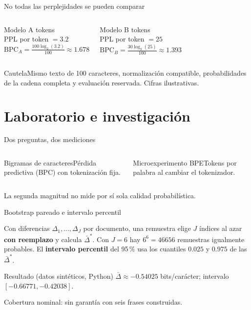 \documentclass[aspectratio=169,10pt]{beamer}
\begin{document}
\begin{frame}{No todas las perplejidades se pueden comparar}
\begin{columns}\begin{block}{Modelo A} tokens\\PPL por token $=3.2$\\$\mathrm{BPC}_A=\frac{100\log_2(3.2)}{100}\approx1.678$\end{block}
\begin{block}{Modelo B} tokens\\PPL por token $=25$\\$\mathrm{BPC}_B=\frac{30\log_2(25)}{100}\approx1.393$\end{block}\end{columns}
\vspace{3mm}\begin{block}{Cautela}\centering Mismo texto de 100 caracteres, normalización compatible, probabilidades de la cadena completa y evaluación reservada. Cifras ilustrativas.\end{block}
\end{frame}

\section{Laboratorio e investigación}
\begin{frame}{Dos preguntas, dos mediciones}
\begin{columns}[T]
\begin{block}{Bigramas de caracteres}Pérdida predictiva (BPC) con tokenización fija.\end{block}
\begin{block}{Microexperimento BPE}Tokens por palabra al cambiar el tokenizador.\end{block}
\end{columns}
\vspace{3mm}\small La segunda magnitud no mide por sí sola calidad probabilística.
\end{frame}

\begin{frame}{Bootstrap pareado e intervalo percentil}
\begin{definition}
Con diferencias $\Delta_1,\ldots,\Delta_J$ por documento, una remuestra elige $J$ índices al azar
\textbf{con reemplazo} y calcula $\bar\Delta^*$. Con $J=6$ hay $6^6=46656$ remuestras igualmente probables.
El \textbf{intervalo percentil} del 95\,\% usa los cuantiles $0.025$ y $0.975$ de las $\bar\Delta^*$.
\end{definition}
\begin{block}{Resultado (datos sintéticos, Python)}
$\bar\Delta\approx-0.54025$ bits/carácter; intervalo $[-0.66771,-0.42038]$.
\end{block}
\small Cobertura nominal: sin garantía con seis frases construidas.
\end{frame}
\end{document}
